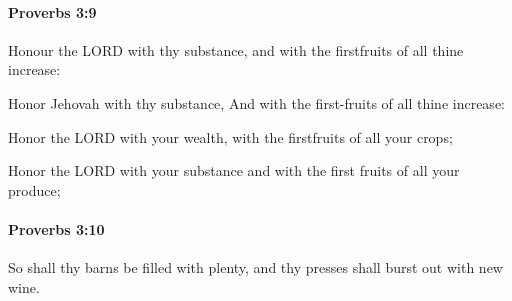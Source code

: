 		\paragraph{Proverbs 3:9} %
			\label{PROVERBS-3-9}

			Honour the LORD with thy substance, and with the firstfruits of all thine increase:

			\begin{versebox}
					\item[BHS] 
					\item[ASV] Honor Jehovah with thy substance, And with the first-fruits of all thine increase:
					\item[NIV] Honor the LORD with your wealth, with the firstfruits of all your crops;
					\item[NRSV] Honor the LORD with your substance and with the first fruits of all your produce;
			\end{versebox}

		\paragraph{Proverbs 3:10} %
			\label{PROVERBS-3-10}

			So shall thy barns be filled with plenty, and thy presses shall burst out with new wine.

